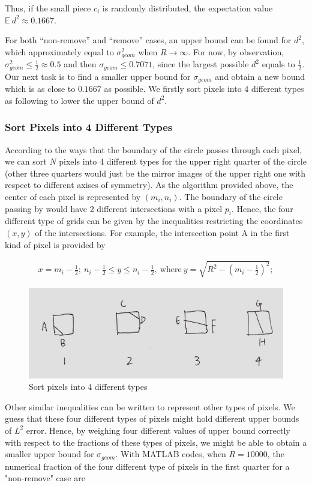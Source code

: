 \documentclass[letterpaper]{article}
\numberwithin{equation}{section} %
\numberwithin{figure}{section} %
\numberwithin{table}{section} %
\begin{document}
\noindent
Thus, if the small piece $c_i$ is randomly distributed, the expectation value $\mathbb{E}\ d^2 \approx 0.1667$. 

For both \enquote{non-remove} and \enquote{remove} cases, an upper bound can be found for $d^2$, which approximately equal to $\sigma_{geom}^2$ when $R \rightarrow \infty$. For now, by observation, $\sigma_{geom}^2 \leq \frac{1}{2} \approx 0.5$ and then $\sigma_{geom} \leq 0.7071$, since the largest possible $d^2$ equals to $\frac{1}{2}$. Our next task is to find a smaller upper bound for  $\sigma_{geom}$ and obtain a new bound which is as close to $0.1667$ as possible. We firstly sort pixels into 4 different types as following to lower the upper bound of $d^2$.

\subsubsection{Sort Pixels into 4 Different Types}
According to the ways that the boundary of the circle passes through each pixel, we can sort $N$ pixels into 4 different types for the upper right quarter of the circle (other three quarters would just be the mirror images of the upper right one with respect to different axises of symmetry). As the algorithm provided above, the center of each pixel is represented by $(m_i, n_i)$. The boundary of the circle passing by would have 2 different intersections with a pixel $p_i$. Hence, the four different type of grids can be given by the inequalities restricting the coordinates $(x,y)$ of the intersections. For example, the intersection point A in the first kind of pixel is provided by  

\begin{align} 
x=m_i-\frac{1}{2}; \ n_i-\frac{1}{2}\leq y \leq n_i-\frac{1}{2}, \ \text{where} \ y=\sqrt{R^2-(m_i-\frac{1}{2})^2};
\end{align}

\begin{figure}[h]
	\centering
	\includegraphics[width=0.5\linewidth]{4ty}
	\caption{Sort pixels into 4 different types}
	\label{fig:4ty}
\end{figure}

\noindent
Other similar inequalities can be written to represent other types of pixels. We guess that these four different types of pixels might hold different upper bounds of $L^2$ error. Hence, by weighing four different values of upper bound correctly with respect to the fractions of these types of pixels, we might be able to obtain a smaller upper bound for $\sigma_{geom}$. With MATLAB codes, when $R=10000$, the numerical fraction of the four different type of pixels in the first quarter for a "non-remove" case are 
\end{document}
